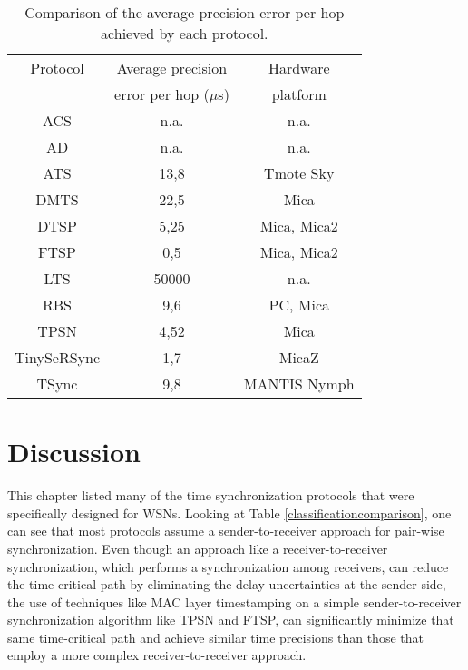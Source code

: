 \begin{table}
\begin{center}
\begin{tabular}{|c|c|c|}
\hline
Protocol & Average precision & Hardware\\
& error per hop ($\mu$s) & platform\\ \hline
ACS \cite{conf/ipsn/PalChaudhuriSJ04}& n.a.& n.a. \\ \hline
AD \cite{conf/infocom/LiR04}& n.a. & n.a. \\ \hline
ATS \cite{schenato07}& 13,8 & Tmote Sky \\ \hline
DMTS \cite{ping03}& 22,5 & Mica \\ \hline
DTSP \cite{solis06}& 5,25 & Mica, Mica2 \\ \hline
FTSP \cite{Maroti04:FTSP}& 0,5 & Mica, Mica2\\ \hline
LTS \cite{conf/wsna/GreunenR03}& 50000 & n.a. \\ \hline
RBS \cite{Elson02-RBS}& 9,6 & PC, Mica \\ \hline
TPSN \cite{Ganeriwal03:TPSN}& 4,52 & Mica \\ \hline
TinySeRSync \cite{conf/ccs/SunNW06}& 1,7 & MicaZ \\ \hline
TSync \cite{journals/sigmobile/DaiH04}& 9,8 & MANTIS Nymph \\                                                   
\hline
\end{tabular}
\caption{Comparison of the average precision error per hop achieved by each protocol.}
\label{precisioncomparison}
\end{center}
\end{table}

\section{Discussion}
This chapter listed many of the time synchronization protocols that were specifically designed for WSNs. Looking at Table \ref{classificationcomparison}, one can see that most protocols assume a sender-to-receiver approach for pair-wise synchronization. Even though an approach like a receiver-to-receiver synchronization, which performs a  synchronization among receivers, can reduce the time-critical path by eliminating the delay uncertainties at the sender side, the use of techniques like MAC layer timestamping on a simple sender-to-receiver synchronization algorithm like TPSN and FTSP,
can significantly minimize that same time-critical path and achieve similar time precisions than those that employ a more
complex receiver-to-receiver approach.

